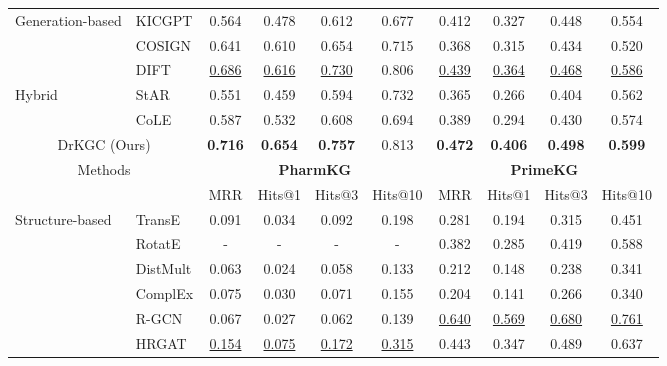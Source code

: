 \documentclass[11pt]{article}
\begin{document}
\begin{table}[!t]
{\begin{tabular}{l|lcccccccc}
\multirow{3}{*}{Generation-based} 
                          & KICGPT                    & 0.564 & 0.478  & 0.612  & 0.677  & 0.412 & 0.327 & 0.448 & 0.554  \\ 
                          & COSIGN                    & 0.641 & 0.610  & 0.654  & 0.715  & 0.368 & 0.315 & 0.434 & 0.520  \\  
                          & DIFT                      & \underline{0.686} & \underline{0.616} & \underline{0.730} & 0.806  & \underline{0.439} & \underline{0.364} & \underline{0.468} & \underline{0.586}  \\ \cmidrule(lr){1-10}
\multirow{2}{*}{Hybrid} 
                          & StAR                      & 0.551 & 0.459  & 0.594  & 0.732  & 0.365 & 0.266 & 0.404 & 0.562  \\
                          & CoLE                      & 0.587 & 0.532  & 0.608  & 0.694  & 0.389 & 0.294 & 0.430 & 0.574  \\ \cmidrule(lr){1-10}
\multicolumn{2}{c}{DrKGC (Ours)}              & \textbf{0.716} & \textbf{0.654} & \textbf{0.757} & 0.813  & \textbf{0.472} & \textbf{0.406} & \textbf{0.498} & \textbf{0.599}  \\ 
\midrule
\multicolumn{2}{c}{\multirow{2}{*}{\centering Methods}} & \multicolumn{4}{c}{\textbf{PharmKG}} & \multicolumn{4}{c}{\textbf{PrimeKG}} \\ \cmidrule(lr){3-6} \cmidrule(lr){7-10}
\multicolumn{2}{c}{}                               & MRR   & Hits@1 & Hits@3 & Hits@10 & MRR   & Hits@1 & Hits@3 & Hits@10 \\ \midrule
\multirow{5}{*}{Structure-based} 
                          & TransE                    & 0.091  & 0.034  & 0.092  & 0.198  & 0.281  & 0.194  & 0.315  & 0.451  \\ 
                          & RotatE                    & -      & -      & -      & -      & 0.382  & 0.285  & 0.419  & 0.588  \\ 
                          & DistMult                  & 0.063  & 0.024  & 0.058  & 0.133  & 0.212  & 0.148  & 0.238  & 0.341  \\ 
                          & ComplEx                   & 0.075  & 0.030  & 0.071  & 0.155  & 0.204  & 0.141  & 0.266  & 0.340  \\ 
                          & R-GCN                    & 0.067  & 0.027  & 0.062  & 0.139  & \underline{0.640}  & \underline{0.569}  & \underline{0.680}  & \underline{0.761}  \\ 
                          & HRGAT                    & \underline{0.154}  & \underline{0.075}  & \underline{0.172}  & \underline{0.315}  & 0.443  & 0.347  & 0.489  & 0.637 \\ 

\end{tabular}}
\end{table}
\end{document}
